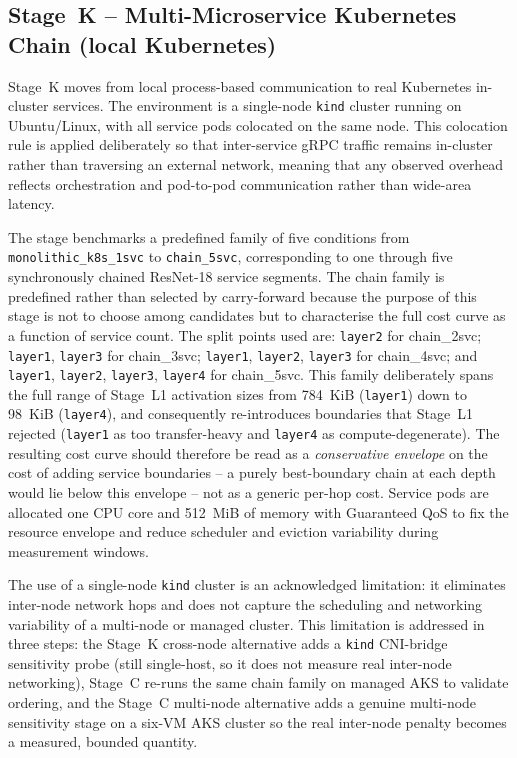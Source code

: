 \subsection{Stage~K -- Multi-Microservice Kubernetes Chain (local Kubernetes)}
\label{sec:methods-rq14}

Stage~K moves from local process-based communication to real Kubernetes in-cluster
services.
The environment is a single-node \texttt{kind} cluster running on Ubuntu/Linux, with
all service pods colocated on the same node.
This colocation rule is applied deliberately so that inter-service gRPC traffic remains
in-cluster rather than traversing an external network, meaning that any observed
overhead reflects orchestration and pod-to-pod communication rather than wide-area
latency.

The stage benchmarks a predefined family of five conditions from
\texttt{monolithic\_k8s\_1svc} to \texttt{chain\_5svc}, corresponding to one through
five synchronously chained ResNet-18 service segments.
The chain family is predefined rather than selected by carry-forward because the purpose
of this stage is not to choose among candidates but to characterise the full cost curve
as a function of service count.
The split points used are: \texttt{layer2} for chain\_2svc;
\texttt{layer1}, \texttt{layer3} for chain\_3svc;
\texttt{layer1}, \texttt{layer2}, \texttt{layer3} for chain\_4svc; and
\texttt{layer1}, \texttt{layer2}, \texttt{layer3}, \texttt{layer4} for chain\_5svc.
This family deliberately spans the full range of Stage~L1 activation sizes from 784~KiB
(\texttt{layer1}) down to 98~KiB (\texttt{layer4}), and consequently re-introduces
boundaries that Stage~L1 rejected (\texttt{layer1} as too transfer-heavy and
\texttt{layer4} as compute-degenerate). The resulting cost curve should therefore be
read as a \emph{conservative envelope} on the cost of adding service boundaries -- a
purely best-boundary chain at each depth would lie below this envelope -- not as a
generic per-hop cost.
Service pods are allocated one CPU core and 512~MiB of memory with Guaranteed QoS to
fix the resource envelope and reduce scheduler and eviction variability during
measurement windows.

The use of a single-node \texttt{kind} cluster is an acknowledged limitation: it
eliminates inter-node network hops and does not capture the scheduling and networking
variability of a multi-node or managed cluster.
This limitation is addressed in three steps: the Stage~K cross-node alternative adds a
\texttt{kind} CNI-bridge sensitivity probe (still single-host, so it does not measure real
inter-node networking), Stage~C re-runs the same chain family on managed AKS to validate
ordering, and the Stage~C multi-node alternative adds a genuine multi-node sensitivity
stage on a six-VM AKS cluster so the real inter-node penalty becomes a measured, bounded
quantity.


